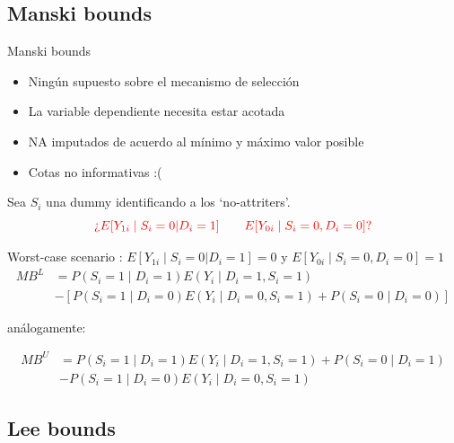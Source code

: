 \documentclass[8pt]{beamer}
\begin{document}
\subsection{Manski bounds}
\begin{frame}[allowframebreaks]{Manski bounds}
    \begin{itemize}
        \item Ningún supuesto sobre el mecanismo de selección
        \item La variable dependiente necesita estar acotada
        \item NA imputados de acuerdo al mínimo y máximo valor posible
        \item Cotas no informativas :(
    \end{itemize}
    
\framebreak

Sea $S_i$ una dummy identificando a los `no-attriters'.\\


\[\color{red}\text{¿}E[Y_{1i}\;|\;S_i = 0|D_i = 1]\quad\quad E[Y_{0i}\;|\;S_i = 0, D_i = 0]?\]

Worst-case scenario :  $E[Y_{1i}\;|\;S_i = 0|D_i = 1] = 0$ y $E[Y_{0i}\;|\;S_i = 0, D_i = 0] = 1$ \\


\begin{align*}
MB^{L} &= P(S_i = 1\;|\;D_i = 1)E(Y_i\;|\;D_i = 1, S_i = 1) \\
&- [P(S_i = 1\;|\;D_i = 0)E(Y_i\;|\;D_i = 0, S_i = 1) + P(S_i = 0\;|\;D_i = 0)]
\end{align*}

análogamente:

\begin{align*}
MB^{U} &= P(S_i = 1\;|\;D_i = 1)E(Y_i\;|\;D_i = 1, S_i = 1) + P(S_i = 0 \;|\; D_i = 1) \\
&- P(S_i = 1\;|\;D_i = 0)E(Y_i\;|\;D_i = 0, S_i = 1)
\end{align*}
\end{frame}

\subsection{Lee bounds}
\end{document}
